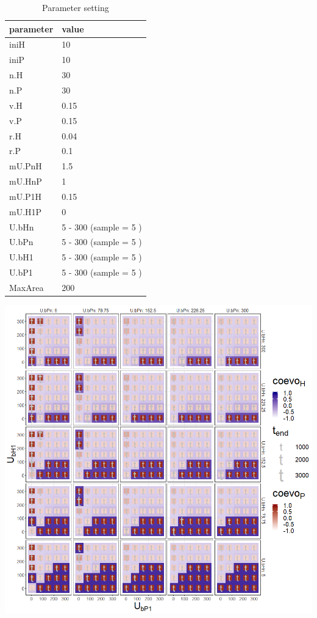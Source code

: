 \documentclass[]{book}
\begin{document}
\begin{table}[!h]

\caption{\label{tab:4UbHUbPtablepdf}Parameter setting}
\centering
\begin{tabular}{l|l}
\hline
parameter & value\\
\hline
iniH & 10\\
\hline
iniP & 10\\
\hline
n.H & 30\\
\hline
n.P & 30\\
\hline
v.H & 0.15\\
\hline
v.P & 0.15\\
\hline
r.H & 0.04\\
\hline
r.P & 0.1\\
\hline
mU.PnH & 1.5\\
\hline
mU.HnP & 1\\
\hline
mU.P1H & 0.15\\
\hline
mU.H1P & 0\\
\hline
U.bHn & 5 - 300 (sample = 5 )\\
\hline
U.bPn & 5 - 300 (sample = 5 )\\
\hline
U.bH1 & 5 - 300 (sample = 5 )\\
\hline
U.bP1 & 5 - 300 (sample = 5 )\\
\hline
MaxArea & 200\\
\hline
\end{tabular}
\end{table}

\newpage

\includegraphics[width=1\linewidth]{plots/4_fourPar-U.bH-U.bP_plot}
\end{document}
